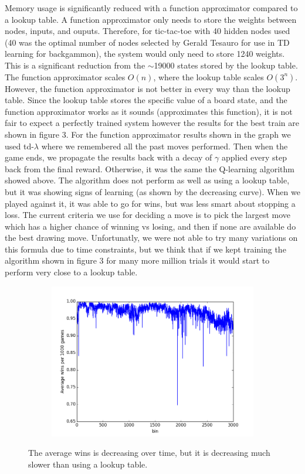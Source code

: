 \documentclass[12pt,a4paper]{article}
\begin{document}
Memory usage is significantly reduced with a function approximator compared to a lookup table. A function approximator only needs to store the weights between nodes, inputs, and ouputs. Therefore, for tic-tac-toe with 40 hidden nodes used (40 was the optimal number of nodes selected by Gerald Tesauro for use in TD learning for backgammon), the system would only need to store 1240 weights. This is a significant reduction from the $\sim$19000 states stored by the lookup table. The function approximator scales $O(n)$, where the lookup table scales $O(3^{n})$. However, the function approximator is not better in every way than the lookup table. Since the lookup table stores the specific value of a board state, and the function approximator works as it sounds (approximates this function), it is not fair to expect a perfectly trained system however the results for the best train are shown in figure 3. For the function approximator results shown in the graph we used td-$\lambda$ where we remembered all the past moves performed. Then when the game ends, we propagate the results back with a decay of $\gamma$ applied every step back from the final reward. Otherwise, it was the same the Q-learning algorithm showed above. The algorithm does not perform as well as using a lookup table, but it was showing signs of learning (as shown by the decreasing curve). When we played against it, it was able to go for wins, but was less smart about stopping a loss. The current criteria we use for deciding a move is to pick the largest move which has a higher chance of winning vs losing, and then if none are available do the best drawing move. Unfortunatly, we were not able to try many variations on this formula due to time constraints, but we think that if we kept training the algorithm shown in figure 3 for many more million trials it would start to perform very close to a lookup table. 
\begin{figure}[h]
\centering
\begin{subfigure}[h]{0.45\textwidth}
\includegraphics[width=\textwidth]{Figures/Fxnaproxtd1.png}
\end{subfigure}
\caption{The average wins is decreasing over time, but it is decreasing much slower than using a lookup table.}
\label{fig:fxnaprox}
\end{figure}
\pagebreak
\end{document}
